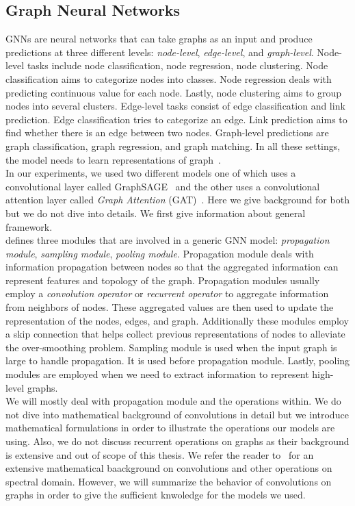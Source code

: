 \subsection{Graph Neural Networks}
\label{subsec:mixedApproaches_GraphNeuralNetworks}
GNNs are neural networks that can take graphs as an input and produce predictions at three different levels:
\emph{node-level}, \emph{edge-level}, and \emph{graph-level}. Node-level tasks include node classification, node
regression, node clustering. Node classification aims to categorize nodes into classes. Node regression deals with
predicting continuous value for each node. Lastly, node clustering aims to group nodes into several clusters. Edge-level tasks consist of edge classification and link prediction. Edge classification tries to categorize an edge. Link prediction aims to find whether there is an edge between two nodes. Graph-level predictions are graph classification, graph regression, and graph matching. In all these settings, the model needs to learn representations of graph~\parencite{GNNsAReview_Zhou}.\\
In our experiments, we used two different models one of which uses a convolutional layer called GraphSAGE~\parencite{GraphSAGE_Hamilton} and the other uses a convolutional attention layer called \emph{Graph Attention} (GAT)~\parencite{GraphAttentionNetworks_Velickovic}. Here we give background for both but we do not dive into details. We first give information about general framework.\\
\cite{GNNsAReview_Zhou} defines three modules that are involved in a generic GNN model: \emph{propagation module}, \emph{sampling module}, \emph{pooling module}. Propagation module deals with information propagation between nodes so that the aggregated information can represent features and topology of the graph. Propagation modules usually employ a \emph{convolution operator} or \emph{recurrent operator} to aggregate information from neighbors of nodes. These aggregated values are then used to update the representation of the nodes, edges, and graph. Additionally these modules employ a skip connection that helps collect previous representations of nodes to alleviate the over-smoothing problem. Sampling module is used when the input graph is large to handle propagation. It is used before propagation module. Lastly, pooling modules are employed when we need to extract information to represent high-level graphs.\\
We will mostly deal with propagation module and the operations within. We do not dive into mathematical background of convolutions in detail but we introduce mathematical formulations in order to illustrate the operations our models are using. Also, we do not discuss recurrent operations on graphs as their background is extensive and out of scope of this thesis. We refer the reader to~\cite{GNNsAReview_Zhou} for an extensive mathematical baackground on convolutions and other operations on spectral domain. However, we will summarize the behavior of convolutions on graphs in order to give the sufficient knwoledge for the models we used.\\
